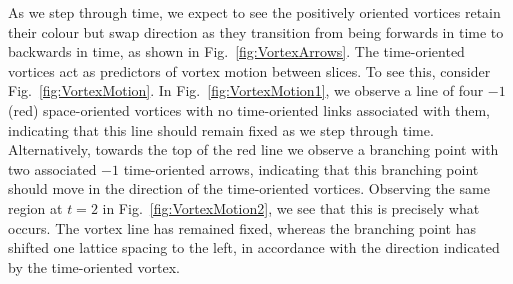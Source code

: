 As we step through time, we expect to see the positively oriented vortices retain their colour but swap direction as they transition from being forwards in time to backwards in time, as shown in Fig.~\ref{fig:VortexArrows}. The time-oriented vortices act as predictors of vortex motion between slices. To see this, consider Fig.~\ref{fig:VortexMotion}. In Fig.~\ref{fig:VortexMotion1}, we observe a line of four $-1$ (red) space-oriented vortices with no time-oriented links associated with them, indicating that this line should remain fixed as we step through time. Alternatively, towards the top of the red line we observe a branching point with two associated $-1$ time-oriented arrows, indicating that this branching point should move in the direction of the time-oriented vortices. Observing the same region at $t=2$ in Fig.~\ref{fig:VortexMotion2}, we see that this is precisely what occurs. The vortex line has remained fixed, whereas the branching point has shifted one lattice spacing to the left, in accordance with the direction indicated by the time-oriented vortex.\\
%
